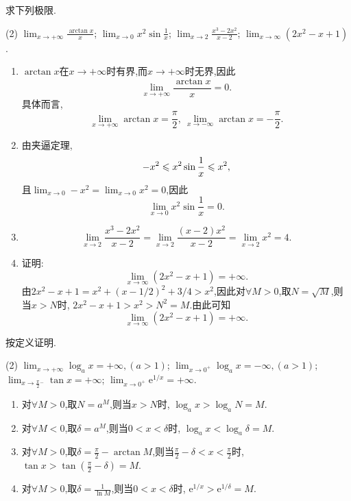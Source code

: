 \begin{exercise}[1.3.10]
    求下列极限.
    \begin{tasks}[label=(\arabic*)](2)
        \task $\lim_{x \to +\infty} \frac{\arctan x}{x}$;
        \task $\lim_{x \to 0} x^2 \sin\frac{1}{x}$;
        \task $\lim_{x \to 2} \frac{x^3-2x^2}{x-2}$;
        \task $\lim_{x \to \infty} (2x^2 - x + 1)$.
    \end{tasks}
\end{exercise}

\begin{solution}
    \begin{enumerate}[(1)]
        \item $\arctan x$在$x \to +\infty$时有界,而$x \to +\infty$时无界,因此$$\lim_{x \to +\infty} \frac{\arctan x}{x} = 0.$$具体而言, $$\lim_{x \to + \infty} \arctan x = \frac{\pi}{2} , \ \lim_{x \to -\infty} \arctan x = -\frac{\pi}{2}.$$
        \item 由夹逼定理, $$-x^2 \leqslant x^2 \sin \frac{1}{x} \leqslant x^2, $$且$\lim_{x \to 0} -x^2 = \lim_{x \to 0} x^2 = 0$,因此$$\lim_{x \to 0} x^2 \sin\frac{1}{x} = 0.$$
        \item $$\lim_{x \to 2} \frac{x^3-2x^2}{x-2} = \lim_{x \to 2} \frac{(x-2)x^2}{x-2} = \lim_{x \to 2}x^2  = 4.$$
        \item 证明: $$\lim_{x \to \infty} (2x^2 - x + 1) = +\infty.$$
              由$2x^2 - x + 1 = x^2 + (x - 1/2)^2 + 3/4 > x^2$,因此对$\forall M > 0$,取$N = \sqrt{M}$,则当$x > N$时, $2x^2 - x + 1 > x^2 > N^2 = M$.由此可知$$\lim_{x \to \infty} (2x^2 - x + 1) = +\infty.$$
    \end{enumerate}
\end{solution}

\begin{exercise}[1.3.11]
    按定义证明.
    \begin{tasks}[label=(\arabic*)](2)
        \task $\lim_{x \to +\infty} \log_a x = +\infty, (a > 1)$;
        \task $\lim_{x \to 0^+} \log_a x = -\infty, (a > 1)$;
        \task $\lim_{x \to \frac{\pi}{2}{}^- }\tan x = +\infty$;
        \task $\lim_{x \to 0^+} \mathrm{e}^{1/x} = +\infty$.
    \end{tasks}
\end{exercise}

\begin{solution}
    \begin{enumerate}[(1)]
        \item 对$\forall M > 0$,取$N = a^M$,则当$x > N$时, $\log_a x > \log_a N = M$.
        \item 对$\forall M < 0$,取$\delta = a^M$,则当$0 < x < \delta$时, $\log_a x < \log_a \delta = M$.
        \item 对$\forall M > 0$,取$\delta = \frac{\pi}{2} - \arctan M$,则当$\frac{\pi}{2} - \delta < x < \frac{\pi}{2}$时, $\tan x > \tan(\frac{\pi}{2} - \delta) = M$.
        \item 对$\forall M > 0$,取$\delta = \frac{1}{\ln M}$,则当$0 < x < \delta$时, $\mathrm{e}^{1/x} > \mathrm{e}^{1/\delta} = M$.
    \end{enumerate}
\end{solution}

